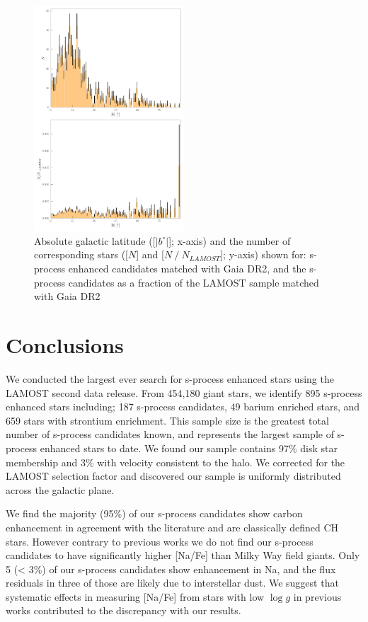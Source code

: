\documentclass[a4paper,fleqn,usenatbib]{mnras}
\begin{document}
\begin{figure}
	\includegraphics[width=0.5\textwidth]{histogram.pdf}
	\caption{Absolute galactic latitude ([$|b^{\circ}|$]; x-axis) and the number of corresponding stars ([$N$] and [$N\mathbin{/}N_{LAMOST}$]; y-axis) shown for: s-process enhanced candidates matched with Gaia DR2, and the s-process candidates as a fraction of the LAMOST sample matched with Gaia DR2 }
	\label{fig:figure5}
\end{figure}

\section{Conclusions} \label{sec:con}

We conducted the largest ever search for s-process enhanced stars using the LAMOST second data release. From 454,180 giant stars, we identify 895 s-process enhanced stars including; 187 s-process candidates, 49 barium enriched stars, and 659 stars with strontium enrichment. This sample size is the greatest total number of s-process candidates known, and represents the largest sample of s-process enhanced stars to date. We found our sample contains 97\% disk star membership and 3\% with velocity consistent to the halo. We corrected for the LAMOST selection factor and discovered our sample is uniformly distributed across the galactic plane.

We find the majority (95\%) of our s-process candidates show carbon enhancement in agreement with the literature and are classically defined CH stars. However contrary to previous works we do not find our s-process candidates to have significantly higher [Na/Fe] than Milky Way field giants. Only 5 (< 3\%) of our s-process candidates show enhancement in Na, and the flux residuals in three of those are likely due to interstellar dust. We suggest that systematic effects in measuring [Na/Fe] from stars with low $\log{g}$ in previous works contributed to the 
discrepancy with our results.
\end{document}
